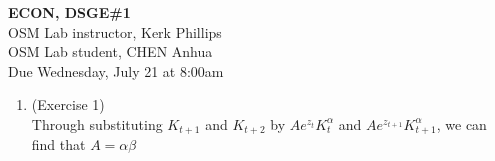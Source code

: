 \documentclass[letterpaper,12pt]{article}
\theoremstyle{definition}
\begin{document}
\begin{flushleft}
   \textbf{\large{ECON, DSGE\#1}} \\[5pt]
   OSM Lab instructor, Kerk Phillips\\[5pt]
   OSM Lab student, CHEN Anhua\\[5pt]
   Due Wednesday, July 21 at 8:00am
\end{flushleft}

\vspace{5mm}


\begin{enumerate}
	\item(Exercise 1)\\
	Through substituting $K_{t + 1}$ and $K_{t + 2}$ by $Ae^{z_{t}}K_{t}^{\alpha}$ and  $Ae^{z_{t + 1}}K_{t + 1}^{\alpha}$, we can find that $A = \alpha \beta$\\


\end{enumerate}
\end{document}
